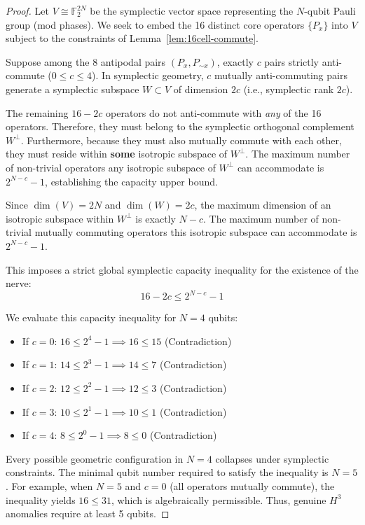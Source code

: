 \documentclass[11pt]{article}
\begin{document}
\begin{proof}
Let $V \cong \mathbb{F}_2^{2N}$ be the symplectic vector space representing the $N$-qubit Pauli group (mod phases). We seek to embed the 16 distinct core operators $\{P_x\}$ into $V$ subject to the constraints of Lemma~\ref{lem:16cell-commute}.

Suppose among the 8 antipodal pairs $(P_x, P_{\sim x})$, exactly $c$ pairs strictly anti-commute ($0 \le c \le 4$). In symplectic geometry, $c$ mutually anti-commuting pairs generate a symplectic subspace $W \subset V$ of dimension $2c$ (i.e., symplectic rank $2c$).

The remaining $16 - 2c$ operators do not anti-commute with \emph{any} of the 16 operators. Therefore, they must belong to the symplectic orthogonal complement $W^\perp$. Furthermore, because they must also mutually commute with each other, they must reside within \textbf{some} isotropic subspace of $W^\perp$. The maximum number of non-trivial operators any isotropic subspace of $W^\perp$ can accommodate is $2^{N-c} - 1$, establishing the capacity upper bound.

Since $\dim(V) = 2N$ and $\dim(W) = 2c$, the maximum dimension of an isotropic subspace within $W^\perp$ is exactly $N - c$. The maximum number of non-trivial mutually commuting operators this isotropic subspace can accommodate is $2^{N-c} - 1$.

This imposes a strict global symplectic capacity inequality for the existence of the nerve:
\begin{equation}
    16 - 2c \le 2^{N-c} - 1
    \label{eq:symplectic-capacity}
\end{equation}

We evaluate this capacity inequality for $N=4$ qubits:
\begin{itemize}
    \item If $c = 0$: $16 \le 2^4 - 1 \implies 16 \le 15$ (Contradiction)
    \item If $c = 1$: $14 \le 2^3 - 1 \implies 14 \le 7$ (Contradiction)
    \item If $c = 2$: $12 \le 2^2 - 1 \implies 12 \le 3$ (Contradiction)
    \item If $c = 3$: $10 \le 2^1 - 1 \implies 10 \le 1$ (Contradiction)
    \item If $c = 4$: $8 \le 2^0 - 1 \implies 8 \le 0$ (Contradiction)
\end{itemize}

Every possible geometric configuration in $N=4$ collapses under symplectic constraints. The minimal qubit number required to satisfy the inequality is $N=5$. For example, when $N=5$ and $c=0$ (all operators mutually commute), the inequality yields $16 \le 31$, which is algebraically permissible. Thus, genuine $H^3$ anomalies require at least 5 qubits.
\end{proof}
\end{document}
